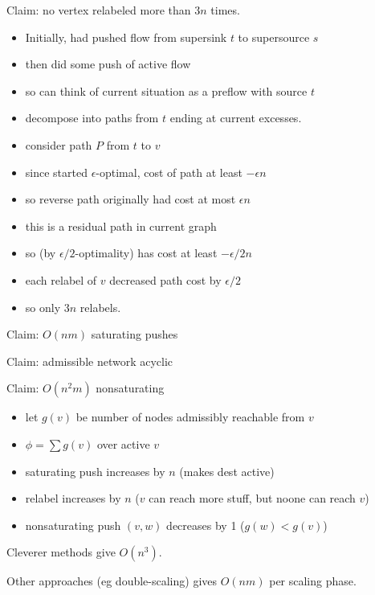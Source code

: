 \documentclass{article}
\begin{document}
Claim: no vertex relabeled more than $3n$ times.
\begin{itemize}
\item Initially, had pushed flow from supersink $t$ to supersource $s$
\item then did some push of active flow
\item so can think of current situation as a preflow with source $t$
\item decompose into paths from $t$ ending at current excesses.
\item consider path $P$ from $t$ to $v$
\item since started $\epsilon$-optimal, cost of path at least
  $-\epsilon n$
\item so reverse path originally had cost at most $\epsilon n$
\item this is a residual path in current graph
\item so (by $\epsilon/2$-optimality) has cost at least $-\epsilon/2
  n$
\item each relabel of $v$ decreased path cost by $\epsilon/2$
\item so only $3n$ relabels.
\end{itemize}

Claim: $O(nm)$ saturating pushes

Claim: admissible network acyclic

Claim: $O(n^2 m)$ nonsaturating
\begin{itemize}
\item let $g(v)$ be number of nodes admissibly reachable from
  $v$
\item $\phi=\sum g(v)$ over active $v$
\item saturating push increases by $n$ (makes dest active)
\item relabel increases by $n$ ($v$ can reach more stuff, but noone
  can reach $v$)
\item nonsaturating push $(v,w)$ decreases by 1 ($g(w)<g(v)$)
\end{itemize}

Cleverer methods give $O(n^3)$.

Other approaches (eg double-scaling) gives $O(nm)$ per scaling phase.
\fi

\end{document}
